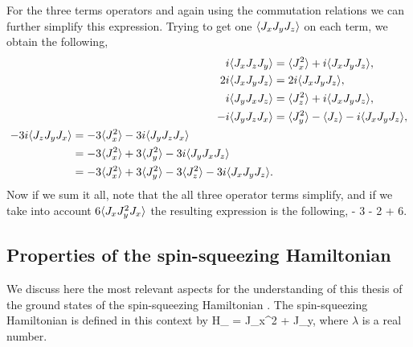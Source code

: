 For the three terms operators and again using the commutation relations we can further simplify this expression. Trying to get one $\langle{J_xJ_yJ_z}\rangle$ on each term, we obtain the following,
\begin{subequations}
\begin{align}
  i\langle{J_xJ_zJ_y}\rangle & = \langle{J_x^2}\rangle+i\langle{J_xJ_yJ_z}\rangle,
  \label{eq:ap-last-terms-1} \\
  2i\langle{J_xJ_yJ_z}\rangle & = 2i\langle{J_xJ_yJ_z}\rangle,
  \label{eq:ap-last-term-2} \\
  i\langle{J_yJ_xJ_z}\rangle & = \langle{J_z^2}\rangle+i\langle{J_xJ_yJ_z}\rangle,
  \label{eq:ap-simplification-3} \\
  -i\langle{J_yJ_zJ_x}\rangle & = \langle{J_y^2}\rangle - \langle{J_z}\rangle - i\langle{J_xJ_yJ_z}\rangle, \\
\begin{split}
  -3i\langle{J_zJ_yJ_x}\rangle & = -3\langle{J_x^2}\rangle - 3i \langle{J_yJ_zJ_x}\rangle \\
  & = -3\langle{J_x^2}\rangle + 3 \langle{J_y^2}\rangle - 3i\langle{J_yJ_xJ_z}\rangle \\
  & = -3\langle{J_x^2}\rangle + 3 \langle{J_y^2}\rangle - 3\langle{J_z^2}\rangle
   - 3i \langle{J_xJ_yJ_z}\rangle.
  \label{eq:ap-simplification-4}
\end{split}
\end{align}
\end{subequations}
Now if we sum it all, note that the all three operator terms simplify, and if we take into account $6\langle{J_xJ_y^2J_x}\rangle$ the resulting expression is the following,
 - 3  - 2 + 6.
\ee

\subsection{Properties of the spin-squeezing Hamiltonian}
\label{app:spin-squeezing-hamiltonian}

We discuss here the most relevant aspects for the understanding of this thesis of the ground states of the spin-squeezing Hamiltonian \cite{Sorensen2001a}.
The spin-squeezing Hamiltonian is defined in this context by
\be
  H_{\lambda} = \pm J_x^2 + \lambda J_y,
  \label{eq:app-spsq-h}
\ee
where $\lambda$ is a real number.

